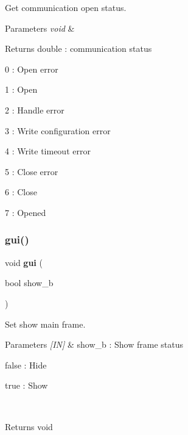 Get communication open status. 


\begin{DoxyCode}{0}
\end{DoxyCode}



\begin{DoxyParams}{Parameters}
{\em void} & \\
\hline
\end{DoxyParams}
\begin{DoxyReturn}{Returns}
double \+: communication status \begin{DoxyItemize}
\item 0 \+: Open error \item 1 \+: Open \item 2 \+: Handle error \item 3 \+: Write configuration error \item 4 \+: Write timeout error \item 5 \+: Close error \item 6 \+: Close \item 7 \+: Opened \end{DoxyItemize}

\end{DoxyReturn}
\mbox{\label{classmain__frame_a61f0cb0eb41e16d4797c2e33c5af8c7d}} 
\subsubsection{gui()}
{\footnotesize\ttfamily void \textbf{ gui} (\begin{DoxyParamCaption}\item[{bool}]{show\+\_\+b }\end{DoxyParamCaption})}



Set show main frame. 


\begin{DoxyCode}{0}
\end{DoxyCode}



\begin{DoxyParams}{Parameters}
{\em \mbox{[}\+I\+N\mbox{]}} & show\+\_\+b \+: Show frame status \begin{DoxyItemize}
\item false \+: Hide \item true \+: Show \end{DoxyItemize}
\\
\hline
\end{DoxyParams}
\begin{DoxyReturn}{Returns}
void 
\end{DoxyReturn}
\mbox{\label{classmain__frame_a282bf29e2a338ad6ff537b3c98162561}} 
